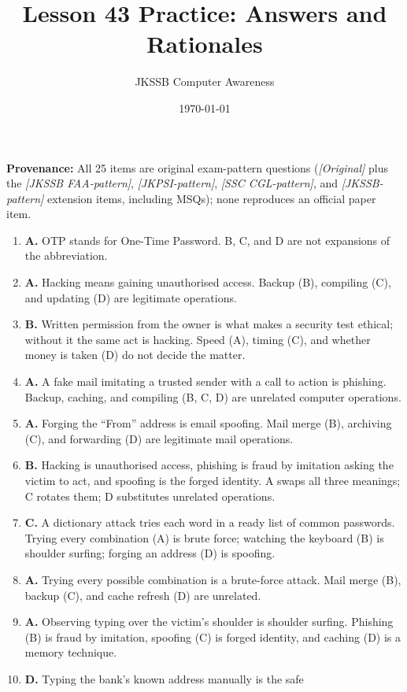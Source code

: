 \documentclass[11pt]{article}
\title{Lesson 43 Practice: Answers and Rationales}
\author{JKSSB Computer Awareness}
\date{\today}
\begin{document}
\maketitle
\noindent\textbf{Provenance:} All 25 items are original exam-pattern questions (\textit{[Original]} plus the \textit{[JKSSB FAA-pattern]}, \textit{[JKPSI-pattern]}, \textit{[SSC CGL-pattern]}, and \textit{[JKSSB-pattern]} extension items, including MSQs); none reproduces an official paper item.
\begin{enumerate}[label=\textbf{Q\arabic*.}, leftmargin=*]
\item \textbf{A.} OTP stands for One-Time Password. B, C, and D are not
  expansions of the abbreviation.
\item \textbf{A.} Hacking means gaining unauthorised access. Backup (B),
  compiling (C), and updating (D) are legitimate operations.
\item \textbf{B.} Written permission from the owner is what makes a
  security test ethical; without it the same act is hacking. Speed (A),
  timing (C), and whether money is taken (D) do not decide the matter.
\item \textbf{A.} A fake mail imitating a trusted sender with a call to
  action is phishing. Backup, caching, and compiling (B, C, D) are
  unrelated computer operations.
\item \textbf{A.} Forging the ``From'' address is email spoofing. Mail
  merge (B), archiving (C), and forwarding (D) are legitimate mail
  operations.
\item \textbf{B.} Hacking is unauthorised access, phishing is fraud by
  imitation asking the victim to act, and spoofing is the forged
  identity. A swaps all three meanings; C rotates them; D substitutes
  unrelated operations.
\item \textbf{C.} A dictionary attack tries each word in a ready list of
  common passwords. Trying every combination (A) is brute force;
  watching the keyboard (B) is shoulder surfing; forging an address (D)
  is spoofing.
\item \textbf{A.} Trying every possible combination is a brute-force
  attack. Mail merge (B), backup (C), and cache refresh (D) are
  unrelated.
\item \textbf{A.} Observing typing over the victim's shoulder is
  shoulder surfing. Phishing (B) is fraud by imitation, spoofing (C) is
  forged identity, and caching (D) is a memory technique.
\item \textbf{D.} Typing the bank's known address manually is the safe

\end{enumerate}
\end{document}
